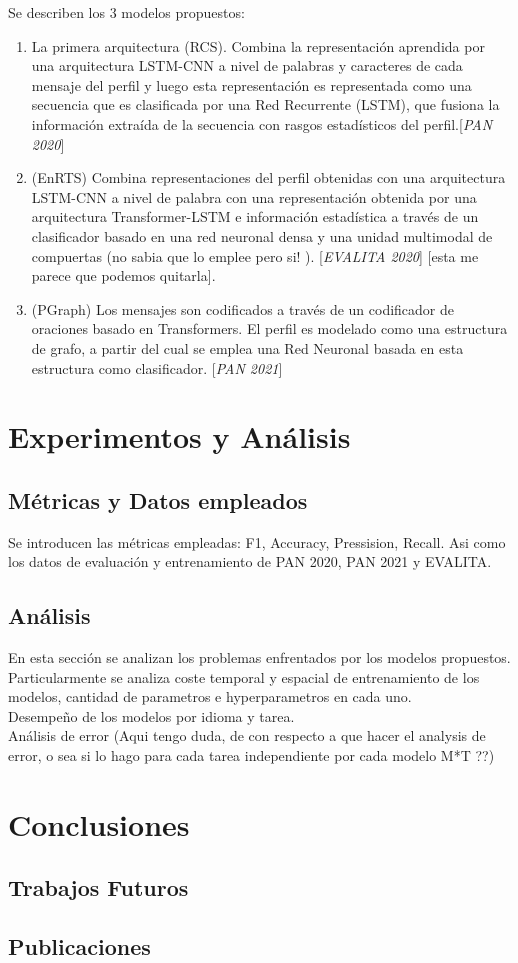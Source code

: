 \documentclass[11pt]{article}
\begin{document}
		Se describen los 3 modelos propuestos:
	
	\begin{enumerate}
		\item La primera arquitectura (RCS). Combina la representación aprendida por una arquitectura LSTM-CNN a nivel de palabras y caracteres de cada mensaje del perfil y luego esta representación es representada como una secuencia que es clasificada por una Red Recurrente (LSTM), que fusiona la información extraída de la secuencia con rasgos estadísticos del perfil.[\textit{PAN 2020}]
		
		\item (EnRTS) Combina representaciones del perfil obtenidas con una arquitectura LSTM-CNN a nivel de palabra con una representación obtenida por una arquitectura Transformer-LSTM e información estadística a través de un clasificador basado en una red neuronal densa y una unidad multimodal de compuertas (no sabia que lo emplee pero si! ). [\textit{EVALITA 2020}]  [esta me parece que podemos quitarla].
		
		\item (PGraph) Los mensajes son codificados a través de un codificador de oraciones basado en Transformers. El perfil es modelado como una estructura de grafo, a partir del cual se emplea una Red Neuronal basada en esta estructura como clasificador. [\textit{PAN 2021}]
	\end{enumerate}
	
	\section{Experimentos y Análisis}
		\subsection{Métricas y Datos empleados}
		Se introducen las métricas empleadas: F1, Accuracy, Pressision, Recall. Asi como los datos de evaluación y entrenamiento de PAN 2020, PAN 2021 y EVALITA. 
		\subsection{Análisis}
			En esta sección se analizan los problemas enfrentados por los modelos propuestos. Particularmente se analiza coste temporal y espacial de entrenamiento de los modelos, cantidad de parametros e hyperparametros en cada uno. \\Desempeño de los modelos  por idioma y tarea.\\
			Análisis de error (Aqui tengo duda, de con respecto a que hacer el analysis de error, o sea si lo hago para cada tarea independiente por cada modelo M*T ??)
		
	\section{Conclusiones }
	\subsection{Trabajos Futuros}
	\subsection{Publicaciones}
	
\end{document}

